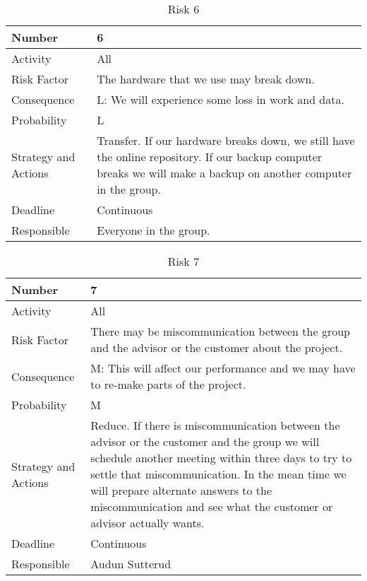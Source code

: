 \documentclass[../document.tex]{subfiles}
\begin{document}
\begin{table}[H]
\caption{Risk 6}
\begin{tabularx}{\textwidth}{|l|X|}
\hline
Number
&6
\\ \hline Activity
&All
\\ \hline Risk Factor
&The hardware that we use may break down.
\\ \hline Consequence
&L: We will experience some loss in work and data.
\\ \hline Probability
&L
\\ \hline Strategy and Actions
&Transfer. If our hardware breaks down, we still have the online repository. If our backup computer breaks we will make a backup on another computer in the group.
\\ \hline Deadline
&Continuous
\\ \hline Responsible
&Everyone in the group.
\\ \hline 
\end{tabularx}
\end{table}

\begin{table}[H]
\caption{Risk 7}
\begin{tabularx}{\textwidth}{|l|X|}
\hline
Number
&7
\\ \hline Activity
&All
\\ \hline Risk Factor
&There may be miscommunication between the group and the advisor or the customer about the project.
\\ \hline Consequence
&M: This will affect our performance and we may have to re-make parts of the project.
\\ \hline Probability
&M
\\ \hline Strategy and Actions
&Reduce. If there is miscommunication between the advisor or the customer and the group we will schedule another meeting within three days to try to settle that miscommunication. In the mean time we will prepare alternate answers to the miscommunication and see what the customer or advisor actually wants.
\\ \hline Deadline
&Continuous
\\ \hline Responsible
&Audun Sutterud
\\ \hline 
\end{tabularx}
\end{table}
\end{document}
